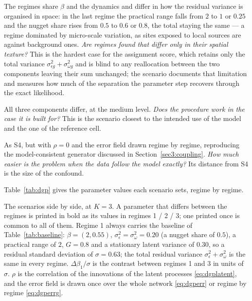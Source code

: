 \begin{description}[leftmargin=1.2em,itemsep=3pt,topsep=3pt]
  \item[\textbf{S3 --- separation in the spatial covariance.}] The regimes share $\beta$ and the dynamics and differ in how the residual variance is organised in space: in the last regime the practical range falls from $2$ to $1$ or $0.25$ and the nugget share rises from $0.5$ to $0.6$ or $0.8$, the total staying the same --- a regime dominated by micro-scale variation, as sites exposed to local sources are against background ones. \emph{Are regimes found that differ only in their spatial texture?} This is the hardest case for the assignment score, which retains only the total variance $\sigma^2_{\epsilon g} + \sigma^2_{\omega g}$ and is blind to any reallocation between the two components leaving their sum unchanged; the scenario documents that limitation and measures how much of the separation the parameter step recovers through the exact likelihood.
  \item[\textbf{S4 --- joint separation.}] All three components differ, at the medium level. \emph{Does the procedure work in the case it is built for?} This is the scenario closest to the intended use of the model and the one of the reference cell.
  \item[\textbf{S5 --- reference.}] As S4, but with $\rho = 0$ and the error field drawn regime by regime, reproducing the model-consistent generator discussed in Section~\ref{sec3:coupling}. \emph{How much easier is the problem when the data follow the model exactly?} Its distance from S4 is the size of the confound.
\end{description}

Table~\ref{tab:dgp} gives the parameter values each scenario sets, regime by regime.

\begin{table}[t]
\centering
\caption{The scenarios side by side, at $K = 3$. A parameter that differs between the regimes is printed in bold as its values in regimes 1 / 2 / 3; one printed once is common to all of them. Regime 1 always carries the baseline of Table~\ref{tab:baseline}: $\beta = (2, 0.55)$, $\sigma^2_\epsilon = \sigma^2_\omega = 0.20$ (a nugget share of $0.5$), a practical range of $2$, $G = 0.8$ and a stationary latent variance of $0.30$, so a residual standard deviation of $\sigma = 0.63$; the total residual variance $\sigma^2_\epsilon + \sigma^2_\omega$ is the same in every regime. $\Delta\beta_1/\sigma$ is the contrast between regimes 1 and 3 in units of $\sigma$. $\rho$ is the correlation of the innovations of the latent processes \eqref{eq:dgplatent}, and the error field is drawn once over the whole network \eqref{eq:dgperr} or regime by regime \eqref{eq:dgperrg}.}
\label{tab:dgp}
{\small\setlength{\tabcolsep}{4pt}}
\end{table}

